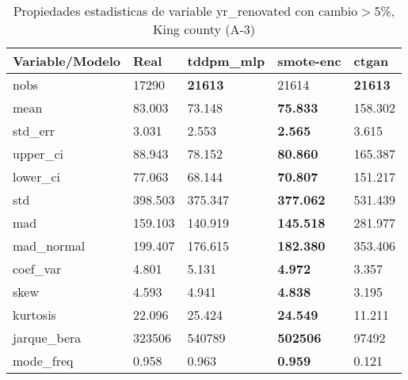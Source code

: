 \begin{table}[H]
\centering
\fontsize{8}{14}\selectfont
\caption{Propiedades estadisticas de variable yr\_renovated con cambio\ensuremath{>}5\%, King county (A-3)}
\label{table-stats-king county-a-3-yr_renovated-short}
\begin{tabular}{|l|m{10em}|m{10em}|m{10em}|m{10em}|}
\hline
 \rowcolor[gray]{0.8}
Variable/Modelo & Real & tddpm\_mlp & smote-enc & ctgan \\
\hline nobs & 17290 & \bfseries 21613 & \cellcolor[rgb]{0.9, 0.54, 0.52} 21614 & \bfseries 21613 \\
\hline mean & 83.003 & 73.148 & \bfseries 75.833 & \cellcolor[rgb]{0.9, 0.54, 0.52} 158.302 \\
\hline std\_err & 3.031 & 2.553 & \bfseries 2.565 & \cellcolor[rgb]{0.9, 0.54, 0.52} 3.615 \\
\hline upper\_ci & 88.943 & 78.152 & \bfseries 80.860 & \cellcolor[rgb]{0.9, 0.54, 0.52} 165.387 \\
\hline lower\_ci & 77.063 & 68.144 & \bfseries 70.807 & \cellcolor[rgb]{0.9, 0.54, 0.52} 151.217 \\
\hline std & 398.503 & 375.347 & \bfseries 377.062 & \cellcolor[rgb]{0.9, 0.54, 0.52} 531.439 \\
\hline mad & 159.103 & 140.919 & \bfseries 145.518 & \cellcolor[rgb]{0.9, 0.54, 0.52} 281.977 \\
\hline mad\_normal & 199.407 & 176.615 & \bfseries 182.380 & \cellcolor[rgb]{0.9, 0.54, 0.52} 353.406 \\
\hline coef\_var & 4.801 & 5.131 & \bfseries 4.972 & \cellcolor[rgb]{0.9, 0.54, 0.52} 3.357 \\
\hline skew & 4.593 & 4.941 & \bfseries 4.838 & \cellcolor[rgb]{0.9, 0.54, 0.52} 3.195 \\
\hline kurtosis & 22.096 & 25.424 & \bfseries 24.549 & \cellcolor[rgb]{0.9, 0.54, 0.52} 11.211 \\
\hline jarque\_bera & 323506 & 540789 & \bfseries 502506 & \cellcolor[rgb]{0.9, 0.54, 0.52} 97492 \\
\hline mode\_freq & 0.958 & 0.963 & \bfseries 0.959 & \cellcolor[rgb]{0.9, 0.54, 0.52} 0.121 \\
\hline
\end{tabular}
\end{table}
